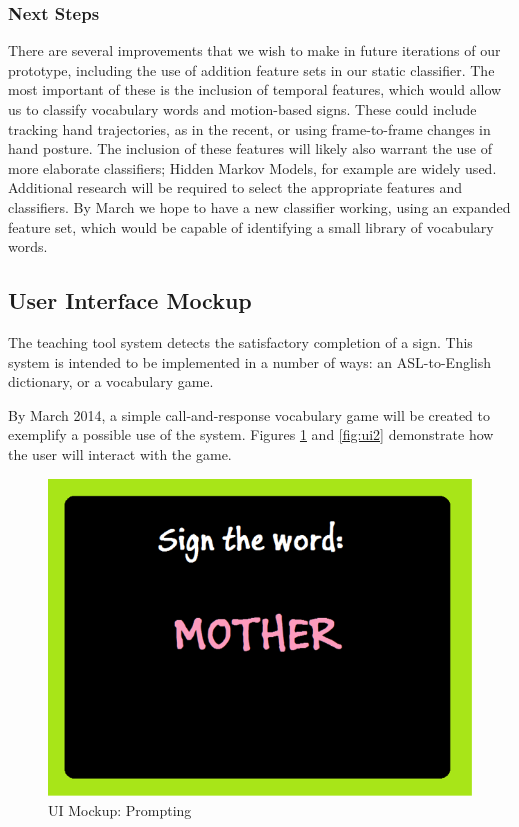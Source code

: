 \documentclass[12pt]{article}
\begin{document}
\subsubsection{Next Steps}
There are several improvements that we wish to make in future iterations of our prototype, including the use of addition feature sets in our static classifier. The most important of these is the inclusion of temporal features, which would allow us to classify vocabulary words and motion-based signs. These could include tracking hand trajectories, as in the recent, or using frame-to-frame changes in hand posture. The inclusion of these features will likely also warrant the use of more elaborate classifiers; Hidden Markov Models, for example are widely used. Additional research will be required to select the appropriate features and classifiers. By March we hope to have a new classifier working, using an expanded feature set, which would be capable of identifying a small library of vocabulary words.

\subsection{User Interface Mockup}
The teaching tool system detects the satisfactory completion of a sign. This system is intended to be implemented in a number of ways: an ASL-to-English dictionary, or a vocabulary game.

By March 2014, a simple call-and-response vocabulary game will be created to exemplify a possible use of the system. Figures \ref{fig:ui1} and \ref{fig:ui2} demonstrate how the user will interact with the game.

\begin{figure}[h]
  \centering
  \includegraphics[scale=1]{Mother.png}
  \caption{UI Mockup: Prompting }
  \label{fig:ui1}
\end{figure}
\end{document}
